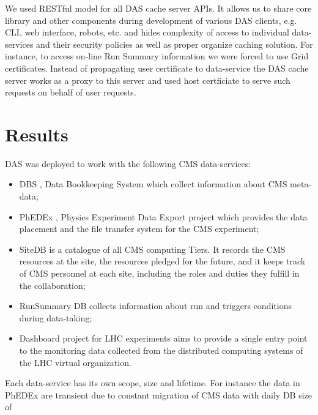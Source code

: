 \documentclass[a4paper]{jpconf}
\begin{document}
We used RESTful model \cite{REST} for all DAS cache server APIs.
It allows us to share core library and other components during development of 
various DAS clients, e.g. CLI, web interface, robots, etc. and hides
complexity of access to individual data-services and their security policies
as well as proper organize caching solution.
For instance, to access on-line Run Summary information we were forced to use
Grid certificates. Instead of propagating user certificate to data-service
the DAS cache server works as a proxy to this server and used host certficiate 
to serve such requests on behalf of user requests.

\section{Results\label{Results}}
DAS was deployed to work with the following CMS data-services:
\begin{itemize}
\item DBS \cite{DBS}, Data Bookkeeping System which collect information
about CMS meta-data;
\item PhEDEx \cite{PhEDEx}, Physics Experiment Data Export project which
provides the data placement and the file transfer system for the CMS experiment;
\item SiteDB \cite{SiteDB} is a catalogue of all CMS computing Tiers. 
It records the CMS resources at the site, the resources pledged for the 
future, and it keeps track of CMS personnel at each site, including the 
roles and duties they fulfill in the collaboration;
\item RunSummary DB \cite{RunSummary} collects information about run and triggers
conditions during data-taking;
\item Dashboard \cite{Dashboard} project for LHC experiments aims to 
provide a single entry point to the monitoring data collected from the 
distributed computing systems of the LHC virtual organization.
\end{itemize}
Each data-service has its own scope, size and lifetime. For instance the data
in PhEDEx are transient due to constant migration of CMS data with daily DB size of
\end{document}
